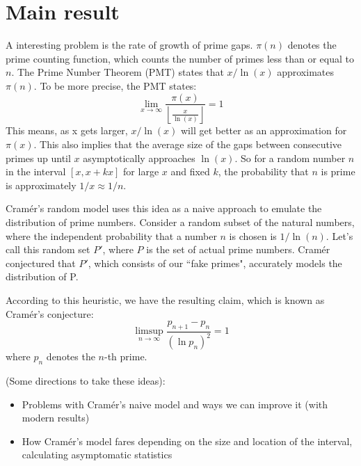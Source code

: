 \documentclass[12pt, letterpaper]{article}
\begin{document}
\section{Main result}
A interesting problem is the rate of growth of prime gaps. $\pi(n)$ denotes the prime counting function, which counts the number of primes less than or equal to $n$. The Prime Number Theorem (PMT) states that $x / \ln(x)$ approximates $\pi(n)$. To be more precise, the PMT states: \[\lim_{x \to \infty} \frac{\pi(x)}{\left\lfloor \frac{x}{\ln(x)} \right\rfloor} = 1\]
This means, as x gets larger, $x / \ln(x)$ will get better as an approximation for $\pi(x)$. This also implies that the average size of the gaps between consecutive primes up until $x$ asymptotically approaches $\ln(x)$. So for a random number $n$ in the interval $[x, x + kx]$ for large $x$ and fixed $k$, the probability that $n$ is prime is approximately $1 / x \approx 1 / n$.

Cram\'er's random model uses this idea as a naive approach to emulate the distribution of prime numbers. Consider a random subset of the natural numbers, where the independent probability that a number $n$ is chosen is $1 / \ln(n)$. Let's call this random set $P'$, where $P$ is the set of actual prime numbers. Cram\'er conjectured that $P'$, which consists of our ``fake primes", accurately models the distribution of P. 

According to this heuristic, we have the resulting claim, which is known as Cram\'er's conjecture:
\[\limsup_{n \to \infty} \frac{p_{n + 1} - p_n}{(\ln p_n)^2} = 1\]
where $p_n$ denotes the $n$-th prime.

(Some directions to take these ideas):
\begin{itemize}
  \item Problems with Cram\'er's naive model and ways we can improve it (with modern results)
  \item How Cram\'er's model fares depending on the size and location of the interval, calculating asymptomatic statistics
\end{itemize}
\end{document}
